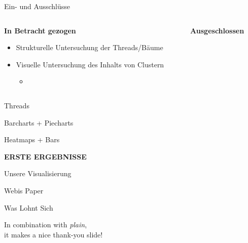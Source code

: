 \documentclass[compress,12pt]{beamer}
\begin{document}
    \begin{frame}{Ein- und Ausschlüsse}
        \begin{columns}
            \begin{column}{0.5\textwidth}
                \textbf{In Betracht gezogen}
                \begin{itemize}
                    \item Strukturelle Untersuchung der Threads/Bäume
                    \item Visuelle Untersuchung des Inhalts von Clustern
                    \begin{itemize}
                        \item
                    \end{itemize}
                \end{itemize}
            \end{column}
            \begin{column}{0.5\textwidth}
                \textbf{Ausgeschlossen}
            \end{column}
        \end{columns}
    \end{frame}

    \End

    \begin{frame}{Threads}

    \end{frame}

    \begin{frame}{Barcharts + Piecharts}

    \end{frame}

    \begin{frame}{Heatmaps + Bars}

    \end{frame}

    \End


    \begin{frame}
        \centering
        \textbf{ERSTE ERGEBNISSE}
    \end{frame}

    \begin{frame}{Unsere Visualisierung}

    \end{frame}

    \begin{frame}{Webis Paper}

    \end{frame}
    \End

    \begin{frame}{Was Lohnt Sich}

    \end{frame}
    \End

    \begin{frame}
        \centering
        In combination with \textit{plain}, \\
        it makes a nice thank-you slide!
    \end{frame}
\end{document}
